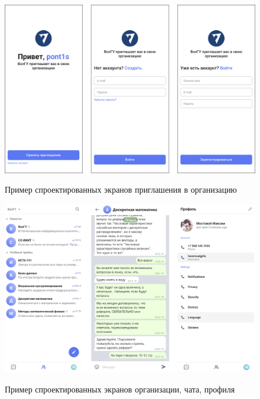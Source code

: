 \begin{figure}[H]
\begin{center}
\includegraphics[width=0.8\hsize]{fig/msg-invite.png}\\[2mm]
\caption{Пример спроектированных экранов приглашения в организацию}\label{fig:msg-invite}
\end{center}
\end{figure}

\begin{figure}[H]
\begin{center}
\includegraphics[width=0.8\hsize]{fig/msg-common.png}\\[2mm]
\caption{Пример спроектированных экранов организации, чата, профиля}\label{fig:msg-common}
\end{center}
\end{figure}